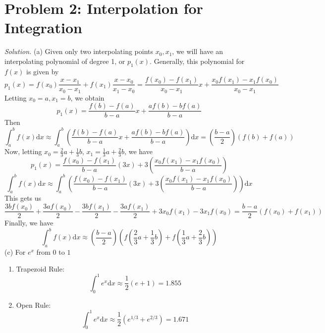 \documentclass{article}
\begin{document}
\section*{Problem 2: Interpolation for Integration}
\emph{Solution. }(a) Given only two interpolating points $x_{0}, x_{1}$, we will have an interpolating polynomial of degree 1, or $p_{1}(x)$. Generally, this polynomial for $f(x)$ is given by
\begin{equation*}
    p_{1}(x) = f(x_0)\frac{x - x_1}{x_0 - x_1} + f(x_1)\frac{x - x_0}{x_1 - x_0} = \frac{f(x_0) - f(x_1)}{x_0 - x_1}x + \frac{x_0 f(x_1) - x_1 f(x_0)}{x_0 - x_1}
\end{equation*}
Letting $x_0 = a, x_1 = b$, we obtain
\begin{equation*}
    p_1(x) = \frac{f(b) - f(a)}{b - a}x + \frac{a f(b) - bf(a)}{b-a}
\end{equation*}
Then
\begin{equation*}
    \int_{a}^{b}f(x)\text{d}x \approx \int_{a}^{b}\left(\frac{f(b) - f(a)}{b - a}x + \frac{a f(b) - bf(a)}{b-a}\right)\text{d}x = \left(\frac{b-a}{2}\right)\left(f(b) + f(a)\right)
\end{equation*}
 Now, letting $x_0 = \frac{2}{3}a + \frac{1}{3}b$, $x_1 = \frac{1}{3}a + \frac{2}{3}b$, we have
\begin{equation*}
    p_{1}(x) = \frac{f(x_{0}) - f(x_{1})}{b-a}(3x) + 3\left(\frac{x_0 f(x_1) - x_1 f(x_0)}{b-a}\right)
\end{equation*}
\begin{equation*}
    \int_{a}^{b} f(x)\text{d}x \approx \int_{a}^{b}\left(\frac{f(x_{0}) - f(x_{1})}{b-a}(3x) + 3\left(\frac{x_0 f(x_1) - x_1 f(x_0)}{b-a}\right)\right)\text{d}x
\end{equation*}
This gets us
\begin{equation*}
    \frac{3bf(x_0)}{2} + \frac{3af(x_0)}{2} - \frac{3bf(x_1)}{2} - \frac{3af(x_1)}{2} + 3x_0 f(x_1)  - 3x_{1}f(x_{0}) = \frac{b-a}{2}\left(f(x_0) + f(x_1)\right)
\end{equation*}
Finally, we have
\begin{equation*}
    \int_{a}^{b}f(x)\text{d}x \approx \left( \frac{b-a}{2}\right)\left(f\left(\frac{2}{3}a + \frac{1}{3}b\right) + f\left(\frac{1}{3}a + \frac{2}{3}b\right)\right)
\end{equation*}
(c) For $e^{x}$ from $0$ to $1$
\begin{enumerate}
    \item Trapezoid Rule: 
    \begin{equation*}
        \int_{0}^{1}e^{x}\text{d}x \approx \frac{1}{2}(e +1) = 1.855
    \end{equation*}
    \item Open Rule: 
    \begin{equation*}
        \int_{0}^{1}e^{x}\text{d}x \approx \frac{1}{2}(e^{1/3} + e^{2/3}) = 1.671
    \end{equation*}
\end{enumerate}
\end{document}

